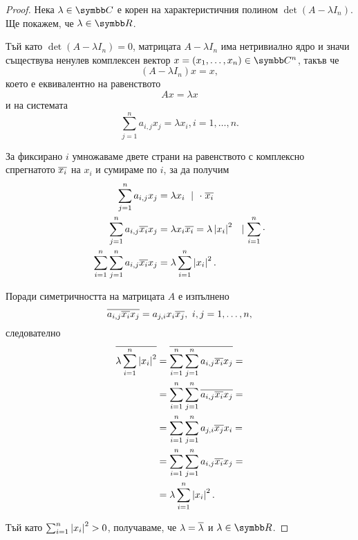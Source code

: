 \documentclass[numbers=endperiod, bibliography=totocnumbered]{scrartcl}
\begin{document}
\begin{proof}
  Нека \( \lambda \in \Complex \) е корен на характеристичния полином \( \det(A - \lambda I_n) \). Ще покажем, че \( \lambda \in \R \).

  Тъй като \( \det(A - \lambda I_n) = 0 \), матрицата \( A - \lambda I_n \) има нетривиално ядро и значи съществува ненулев комплексен вектор \( x = (x_1, \ldots, x_n) \in \Complex^n \), такъв че
  \begin{equation*}
    (A - \lambda I_n) x = x,
  \end{equation*}
  което е еквивалентно на равенството
  \begin{equation*}
    A x = \lambda x
  \end{equation*}
  и на системата
  \begin{equation*}
    \sum_{j=1}^n a_{i,j} x_j = \lambda x_i, i = 1, \ldots, n.
  \end{equation*}

  За фиксирано \( i \) умножаваме двете страни на равенството с комплексно спрегнатото \( \overline{x_i} \) на \( x_i \) и сумираме по \( i \), за да получим
  \begin{align*}
    \sum_{j=1}^n a_{i,j} x_j
    &=
    \lambda x_i~\mid~\cdot \; \overline{x_i}
    \\
    \sum_{j=1}^n a_{i,j} \overline{x_i} x_j
    &=
    \lambda x_i \overline{x_i} = \lambda \left\vert x_i \right\vert^2~~\mid \sum_{i=1}^n \cdot
    \\
    \sum_{i=1}^n \sum_{j=1}^n a_{i,j} \overline{x_i} x_j
    &=
    \lambda \sum_{i=1}^n \left\vert x_i \right\vert^2.
  \end{align*}

  Поради симетричността на матрицата \( A \) е изпълнено
  \begin{equation*}
    \overline{a_{i,j} \overline{x_i} x_j}
    =
    a_{j,i} x_i \overline{x_j},~i, j = 1, \ldots, n,
  \end{equation*}
  следователно
  \begin{align*}
    \overline{\lambda \sum_{i=1}^n \left\vert x_i \right\vert^2}
    &=
    \overline{\sum_{i=1}^n \sum_{j=1}^n a_{i,j} \overline{x_i} x_j}
    = \\ &=
    \sum_{i=1}^n \sum_{j=1}^n \overline{a_{i,j} \overline{x_i} x_j}
    = \\ &=
    \sum_{i=1}^n \sum_{j=1}^n a_{j,i} \overline{x_j} x_i
    = \\ &=
    \sum_{i=1}^n \sum_{j=1}^n a_{i,j} \overline{x_i} x_j
    = \\ &=
    \lambda \sum_{i=1}^n \left\vert x_i \right\vert^2.
  \end{align*}

  Тъй като \( \sum_{i=1}^n \left\vert x_i \right\vert^2 > 0 \), получаваме, че \( \lambda = \overline{\lambda} \) и \( \lambda \in \R \).
\end{proof}
\end{document}
